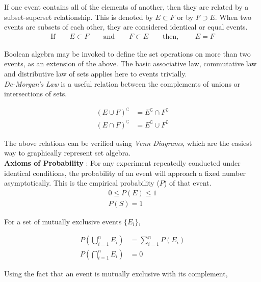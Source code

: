 If one event contains all of the elements of another, then they are related by a subset-superset relationship. This is denoted by $ E \subset F $ or by $ F \supset E $. When two events are subsets of each other, they are considered identical or equal events. \\

\begin{align}
	\text{If} \qquad E \subset F \qquad \text{and} \qquad F \subset E \qquad \text{then, } \qquad E = F
\end{align}

Boolean algebra may be invoked to define the set operations on more than two events, as an extension of the above. The basic associative law, commutative law and distributive law of sets applies here to events trivially. \\

\textit{De-Morgan's Law} is a useful relation between the complements of unions or intersections of sets. 

\begin{align}
	(E \cup F)^{\complement} &= E^\complement \cap F^\complement \\
	(E \cap F)^{\complement} &= E^\complement \cup F^\complement 
\end{align}

The above relations can be verified using \textit{Venn Diagrams}, which are the easiest way to graphically represent set algebra. \\

\textbf{Axioms of Probability} : For any experiment repeatedly conducted under identical conditions, the probability of an event will approach a fixed number asymptotically. This is the empirical probability ($ P $) of that event. \\

\begin{align}
	0 \leq P(E) \leq 1 \\
	P(S) = 1 
\end{align}

For a set of mutually exclusive events $ \{ E_i \} $, 

\begin{align}
	P \left( \bigcup_{i = 1}^{n} E_i \right) &= \sum\limits_{i = 1}^{n} P(E_i) \\
	P \left( \bigcap_{i = 1}^{n} E_i \right) &= 0
\end{align}

Using the fact that an event is mutually exclusive with its complement, 


